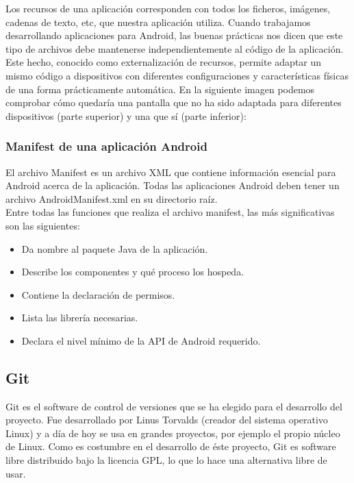 Los recursos de una aplicación corresponden con todos los ficheros, imágenes, cadenas de texto, etc, que nuestra aplicación utiliza. Cuando trabajamos desarrollando aplicaciones para Android, las buenas prácticas nos dicen que este tipo de archivos debe mantenerse independientemente al código de la aplicación.\\

Este hecho, conocido como externalización de recursos, permite adaptar un mismo código a dispositivos con diferentes configuraciones y características físicas de una forma prácticamente automática. En la siguiente imagen podemos comprobar cómo quedaría una pantalla que no ha sido adaptada para diferentes dispositivos (parte superior) y una que sí (parte inferior):


\subsubsection{Manifest de una aplicación Android}

El archivo Manifest es un archivo XML que contiene información esencial para Android acerca de la aplicación. Todas las aplicaciones Android deben tener un archivo AndroidManifest.xml en su directorio raíz.\\

Entre todas las funciones que realiza el archivo manifest, las más significativas son las siguientes:

\begin{itemize}
\item Da nombre al paquete Java de la aplicación.
\item Describe los componentes y qué proceso los hospeda.
\item Contiene la declaración de permisos.
\item Lista las librería necesarias.
\item Declara el nivel mínimo de la API de Android requerido.
\end{itemize}

\subsection{Git}

Git es el software de control de versiones que se ha elegido para el desarrollo del proyecto. Fue desarrollado por Linus Torvalds (creador del sistema operativo Linux) y a día de hoy se usa en grandes proyectos, por ejemplo el propio núcleo de Linux. Como es costumbre en el desarrollo de éste proyecto, Git es software libre distribuido bajo la licencia GPL, lo que lo hace una alternativa libre de usar.\\

